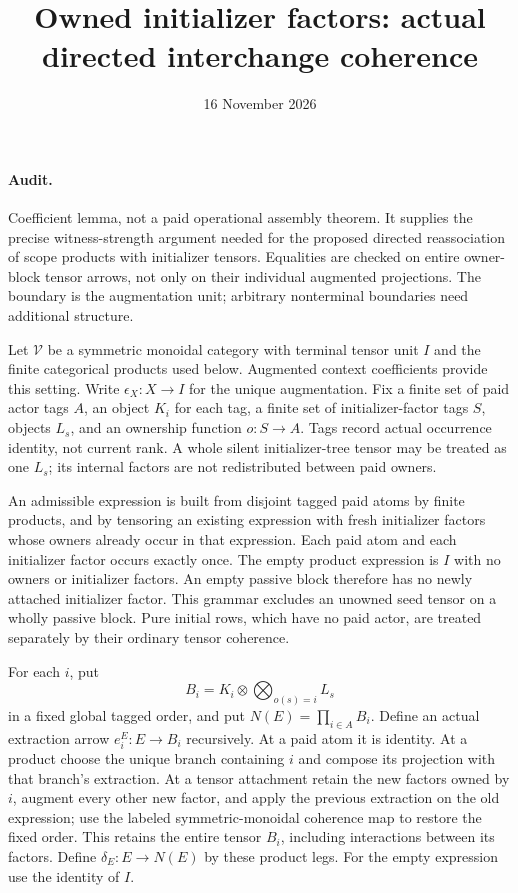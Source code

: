 \documentclass[11pt]{article}
\title{Owned initializer factors: actual directed interchange coherence}
\date{16 November 2026}
\begin{document}
\maketitle
\paragraph{Audit.} Coefficient lemma, not a paid operational assembly theorem. It supplies the precise witness-strength argument needed for the proposed directed reassociation of scope products with initializer tensors. Equalities are checked on entire owner-block tensor arrows, not only on their individual augmented projections. The boundary is the augmentation unit; arbitrary nonterminal boundaries need additional structure.

Let $\mathcal V$ be a symmetric monoidal category with terminal tensor unit $I$ and the finite categorical products used below. Augmented context coefficients provide this setting. Write $\epsilon_X:X\to I$ for the unique augmentation. Fix a finite set of paid actor tags $A$, an object $K_i$ for each tag, a finite set of initializer-factor tags $S$, objects $L_s$, and an ownership function $o:S\to A$. Tags record actual occurrence identity, not current rank. A whole silent initializer-tree tensor may be treated as one $L_s$; its internal factors are not redistributed between paid owners.

An admissible expression is built from disjoint tagged paid atoms by finite products, and by tensoring an existing expression with fresh initializer factors whose owners already occur in that expression. Each paid atom and each initializer factor occurs exactly once. The empty product expression is $I$ with no owners or initializer factors. An empty passive block therefore has no newly attached initializer factor. This grammar excludes an unowned seed tensor on a wholly passive block. Pure initial rows, which have no paid actor, are treated separately by their ordinary tensor coherence.

For each $i$, put
\[
 B_i=K_i\otimes\bigotimes_{o(s)=i}L_s
\]
in a fixed global tagged order, and put $N(E)=\prod_{i\in A}B_i$. Define an actual extraction arrow $e_i^E:E\to B_i$ recursively. At a paid atom it is identity. At a product choose the unique branch containing $i$ and compose its projection with that branch's extraction. At a tensor attachment retain the new factors owned by $i$, augment every other new factor, and apply the previous extraction on the old expression; use the labeled symmetric-monoidal coherence map to restore the fixed order. This retains the entire tensor $B_i$, including interactions between its factors. Define $\delta_E:E\to N(E)$ by these product legs. For the empty expression use the identity of $I$.
\end{document}
